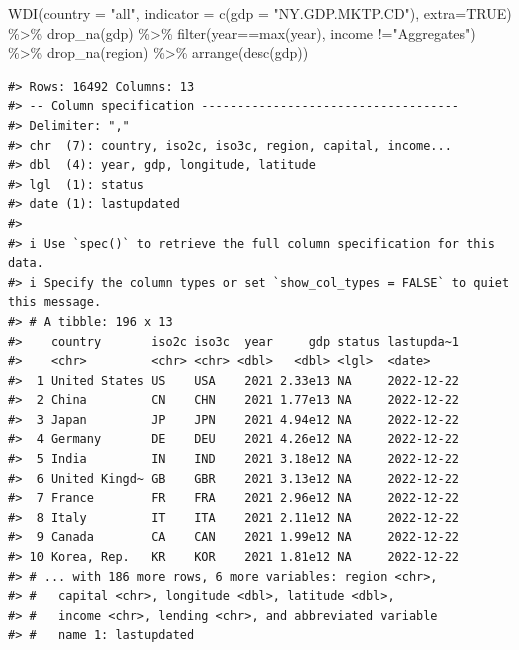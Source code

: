 \documentclass[
]{bxjsbook}
\newenvironment{Shaded}{\begin{snugshade}}{\end{snugshade}}
\newcommand{\AttributeTok}[1]{\textcolor[rgb]{0.77,0.63,0.00}{#1}}
\newcommand{\ConstantTok}[1]{\textcolor[rgb]{0.00,0.00,0.00}{#1}}
\newcommand{\FunctionTok}[1]{\textcolor[rgb]{0.00,0.00,0.00}{#1}}
\newcommand{\NormalTok}[1]{#1}
\newcommand{\SpecialCharTok}[1]{\textcolor[rgb]{0.00,0.00,0.00}{#1}}
\newcommand{\StringTok}[1]{\textcolor[rgb]{0.31,0.60,0.02}{#1}}
\theoremstyle{definition}
\theoremstyle{definition}
\theoremstyle{definition}
\theoremstyle{definition}
\theoremstyle{remark}
\begin{document}
\begin{Shaded}
\begin{Highlighting}[]
\FunctionTok{WDI}\NormalTok{(}\AttributeTok{country =} \StringTok{"all"}\NormalTok{, }\AttributeTok{indicator =} \FunctionTok{c}\NormalTok{(}\AttributeTok{gdp =} \StringTok{"NY.GDP.MKTP.CD"}\NormalTok{),}
    \AttributeTok{extra=}\ConstantTok{TRUE}\NormalTok{) }\SpecialCharTok{\%\textgreater{}\%} \FunctionTok{drop\_na}\NormalTok{(gdp) }\SpecialCharTok{\%\textgreater{}\%}
  \FunctionTok{filter}\NormalTok{(year}\SpecialCharTok{==}\FunctionTok{max}\NormalTok{(year), income }\SpecialCharTok{!=}\StringTok{"Aggregates"}\NormalTok{) }\SpecialCharTok{\%\textgreater{}\%} 
  \FunctionTok{drop\_na}\NormalTok{(region) }\SpecialCharTok{\%\textgreater{}\%} \FunctionTok{arrange}\NormalTok{(}\FunctionTok{desc}\NormalTok{(gdp))}
\end{Highlighting}
\end{Shaded}

\begin{verbatim}
#> Rows: 16492 Columns: 13
#> -- Column specification ------------------------------------
#> Delimiter: ","
#> chr  (7): country, iso2c, iso3c, region, capital, income...
#> dbl  (4): year, gdp, longitude, latitude
#> lgl  (1): status
#> date (1): lastupdated
#> 
#> i Use `spec()` to retrieve the full column specification for this data.
#> i Specify the column types or set `show_col_types = FALSE` to quiet this message.
#> # A tibble: 196 x 13
#>    country       iso2c iso3c  year     gdp status lastupda~1
#>    <chr>         <chr> <chr> <dbl>   <dbl> <lgl>  <date>    
#>  1 United States US    USA    2021 2.33e13 NA     2022-12-22
#>  2 China         CN    CHN    2021 1.77e13 NA     2022-12-22
#>  3 Japan         JP    JPN    2021 4.94e12 NA     2022-12-22
#>  4 Germany       DE    DEU    2021 4.26e12 NA     2022-12-22
#>  5 India         IN    IND    2021 3.18e12 NA     2022-12-22
#>  6 United Kingd~ GB    GBR    2021 3.13e12 NA     2022-12-22
#>  7 France        FR    FRA    2021 2.96e12 NA     2022-12-22
#>  8 Italy         IT    ITA    2021 2.11e12 NA     2022-12-22
#>  9 Canada        CA    CAN    2021 1.99e12 NA     2022-12-22
#> 10 Korea, Rep.   KR    KOR    2021 1.81e12 NA     2022-12-22
#> # ... with 186 more rows, 6 more variables: region <chr>,
#> #   capital <chr>, longitude <dbl>, latitude <dbl>,
#> #   income <chr>, lending <chr>, and abbreviated variable
#> #   name 1: lastupdated
\end{verbatim}
\end{document}
